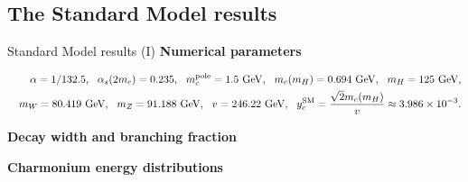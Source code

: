 \documentclass[aspectratio=169]{beamer}
\begin{document}
\subsection{The Standard Model results}
\begin{frame}{Standard Model results (I)}
	\hspace{3mm}\textcolor{PittRoyal}{\bf Numerical parameters}
	\begin{tiny}
	\begin{eqnarray}
		&&\alpha=1/132.5, ~~\alpha_s(2 m_c)=0.235,~~ m_c^{\rm pole}=1.5~{\rm GeV},
		~~m_c(m_H)=0.694~{\text {\rm GeV}}, ~~
			m_H=125~{\text {\rm GeV}}, \nonumber \\
			&&m_W=80.419~{\text {\rm GeV}},~~ m_Z=91.188~{\text {\rm GeV}},
			~~v =246.22\ {\text {\rm GeV}},~~y_c^{\rm SM}= \frac{{\sqrt 2}m_c(m_H)}{ v} \approx 3.986\times 10^{-3}. \nonumber
	\end{eqnarray}
	\end{tiny}
	\vspace{-2mm}\hspace{3mm}\textcolor{PittRoyal}{\bf Decay width and branching fraction}
	\begin{table}[htb]
	\end{table}
	\hspace{3mm}\textcolor{PittRoyal}{\bf Charmonium energy distributions}

\end{frame}
\end{document}
